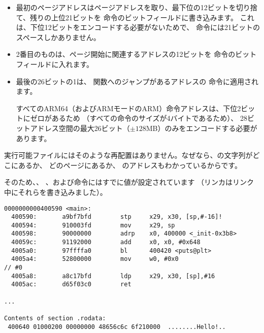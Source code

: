 \begin{itemize}
\item 
最初のページアドレスはページアドレスを取り、最下位の12ビットを切り捨て、残りの上位21ビットを
命令のビットフィールドに書き込みます。 これは、下位12ビットをエンコードする必要がないためで、
命令には21ビットのスペースしかありません。

\item 
2番目のものは、ページ開始に関連するアドレスの12ビットを \ADD 命令のビットフィールドに入れます。

\item 
最後の26ビットの1は、 \printf 関数へのジャンプがあるアドレスの
命令に適用されます。

すべてのARM64（およびARMモードのARM）命令アドレスは、下位2ビットにゼロがあるため
（すべての命令のサイズが4バイトであるため）、
28ビットアドレス空間の最大26ビット（$\pm 128$MB）のみをエンコードする必要があります。 

\end{itemize}

実行可能ファイルにはそのような再配置はありません。なぜなら、の文字列がどこにあるか、
どのページにあるか、 \puts のアドレスもわかっているからです。

そのため、、 \ADD 、および命令にはすでに値が設定されています
（リンカはリンク中にそれらを書き込みました）。

\begin{lstlisting}[caption=objdump of executable file,style=customasmARM]
0000000000400590 <main>:
  400590:       a9bf7bfd        stp     x29, x30, [sp,#-16]!
  400594:       910003fd        mov     x29, sp
  400598:       90000000        adrp    x0, 400000 <_init-0x3b8>
  40059c:       91192000        add     x0, x0, #0x648
  4005a0:       97ffffa0        bl      400420 <puts@plt>
  4005a4:       52800000        mov     w0, #0x0                        // #0
  4005a8:       a8c17bfd        ldp     x29, x30, [sp],#16
  4005ac:       d65f03c0        ret

...

Contents of section .rodata:
 400640 01000200 00000000 48656c6c 6f210000  ........Hello!..
\end{lstlisting}


